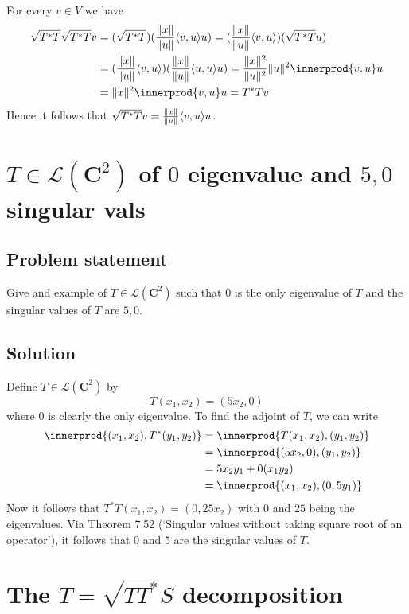 \documentclass{article}
\DeclarePairedDelimiter{\innerprod}\langle\rangle
\begin{document}
For every $v\in V$ we have
\begin{align*}
    \sqrt{T^*T}\sqrt{T^*T}v &= (\sqrt{T^*T})(\frac{\norm{x}}{\norm{u}}\langle v,u\rangle u)= (\frac{\norm{x}}{\norm{u}}\langle v,u\rangle)(\sqrt{T^*T}u)\\
    &= (\frac{\norm{x}}{\norm{u}}\langle v,u\rangle)(\frac{\norm{x}}{\norm{u}}\langle u,u\rangle u)=\frac{\norm{x}^2}{\norm{u}^2}\norm{u}^2\innerprod{v,u}u\\
    &= \norm{x}^2\innerprod{v,u}u=T^*Tv
\end{align*}
Hence it follows that $\sqrt{T^*T}v=\frac{\lVert x\rVert}{\lVert u\rVert}\langle v,u\rangle u$.

\clearpage

\section{$T\in\mathcal{L}(\mathbf{C}^2)$ of $0$ eigenvalue and $5,0$ singular vals}
\subsection*{Problem statement}
Give and example of $T\in\mathcal{L}(\mathbf{C}^2)$ such that $0$ is the only eigenvalue of $T$ and the singular values of $T$ are $5,0$.

\subsection*{Solution}
Define $T\in\mathcal{L}(\mathbf{C}^2)$ by
\[T(x_1,x_2)=(5x_2,0)\]
where 0 is clearly the only eigenvalue. To find the adjoint of $T$, we can write
\begin{align*}
    \innerprod{(x_1,x_2),T^*(y_1,y_2)}&=\innerprod{T(x_1,x_2),(y_1,y_2)}\\
    &= \innerprod{(5x_2,0),(y_1,y_2)}\\
    &= 5x_2y_1+0(x_1y_2)\\
    &=\innerprod{(x_1,x_2),(0,5y_1)}
\end{align*}
Now it follows that $T^*T(x_1,x_2)=(0,25x_2)$ with $0$ and $25$ being the eigenvalues. Via Theorem 7.52 (`Singular values without taking square root of an operator'), it follows that $0$ and $5$ are the singular values of $T$.

\clearpage

\section{The $T=\sqrt{TT^*}S$ decomposition}
\end{document}
